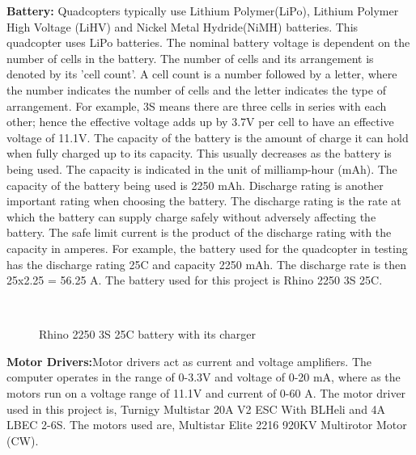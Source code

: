 \documentclass[letterpaper%
, twoside%
, 12pt%
,memoire%
, english%
,creativecommons,hyperref%
]{thETS}
\begin{document}
\textbf{Battery:} Quadcopters typically use Lithium Polymer(LiPo), Lithium Polymer High Voltage (LiHV) and Nickel Metal Hydride(NiMH) batteries. This quadcopter uses LiPo batteries. The nominal battery voltage is dependent on the number of cells in the battery. The number of cells and its arrangement is denoted by its 'cell count'. A cell count is a number followed by a letter, where the number indicates the number of cells and the letter indicates the type of arrangement. For example, 3S means there are three cells in series with each other; hence the effective voltage adds up by 3.7V per cell to have an effective voltage of 11.1V. The capacity of the battery is the amount of charge it can hold when fully charged up to its capacity. This usually decreases as the battery is being used. The capacity is indicated in the unit of milliamp-hour (mAh). The capacity of the battery being used is 2250 mAh. Discharge rating is another important rating when choosing the battery. The discharge rating is the rate at which the battery can supply charge safely without adversely affecting the battery. The safe limit current is the product of the discharge rating with the capacity in amperes. For example, the battery used for the quadcopter in testing has the discharge rating 25C and capacity 2250 mAh. The discharge rate is then 25x2.25 = 56.25 A. The battery used for this project is Rhino 2250 3S 25C. 

\begin{figure}[H]
	\centering
	 \\ \parbox{0.75\textwidth}{\caption{{Rhino 2250 3S 25C battery with its charger \label{Fig:battery}}}}
\end{figure}
\textbf{Motor Drivers:}Motor drivers act as current and voltage amplifiers. The computer operates in the range of 0-3.3V and voltage of 0-20 mA, where as the motors run on a voltage range of 11.1V and current of 0-60 A. The motor driver used in this project is, Turnigy Multistar 20A V2 ESC With BLHeli and 4A LBEC 2-6S. The motors used are, Multistar Elite 2216 920KV Multirotor Motor (CW).

\FloatBarrier
\end{document}
